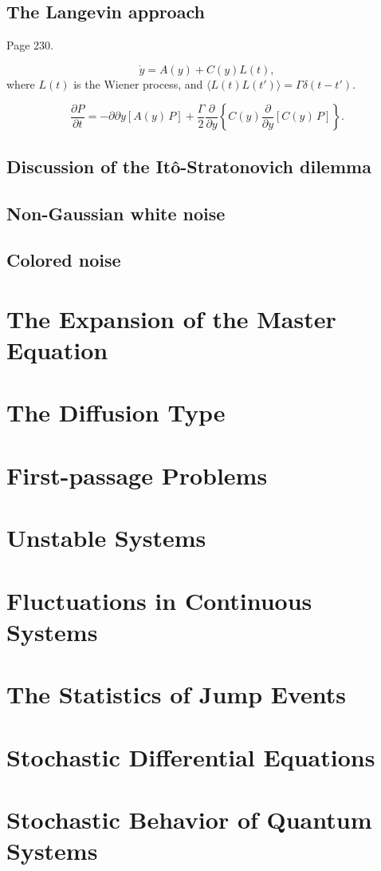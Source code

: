 \documentclass{book}
\theoremstyle{plain}
\theoremstyle{definition}
\theoremstyle{remark}
\begin{document}
\section{The Langevin approach}

Page 230.

$$
\dot y = A(y) + C(y) L(t),
$$
where $L(t)$ is the Wiener process,
and $\langle L(t) L(t') \rangle = \Gamma \delta(t - t')$.


$$
\frac{ \partial P }{ \partial t }
=
-{ \partial } { \partial y } [ A(y) \, P ]
+
\frac{ \Gamma } { 2 } \frac{ \partial } { \partial y }
\left\{
  C(y)
  \frac{ \partial } { \partial y } [ C(y) \, P ]
\right\}.
$$

\section{Discussion of the It\^o-Stratonovich dilemma}

\section{Non-Gaussian white noise}

\section{Colored noise}

\chapter{The Expansion of the Master Equation}

\chapter{The Diffusion Type}

\chapter{First-passage Problems}

\chapter{Unstable Systems}

\chapter{Fluctuations in Continuous Systems}

\chapter{The Statistics of Jump Events}

\chapter{Stochastic Differential Equations}

\chapter{Stochastic Behavior of Quantum Systems}



\end{document}

